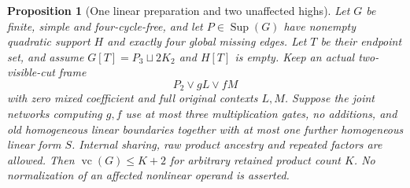 \documentclass[11pt]{article}
\newcommand{\Sup}{\operatorname{Sup}}
\newcommand{\vc}{\operatorname{vc}}
\newtheorem{proposition}[theorem]{Proposition}
\theoremstyle{definition}
\theoremstyle{remark}
\begin{document}
\begin{proposition}[One linear preparation and two unaffected highs]\label{prop:pathpurelinear}
Let $G$ be finite, simple and four-cycle-free, and let $P\in\Sup(G)$ have nonempty quadratic support $H$ and exactly four global missing edges. Let $T$ be their endpoint set, and assume $G[T]=P_3\sqcup2K_2$ and $H[T]$ is empty. Keep an actual two-visible-cut frame
\[
 P_2\vee gL\vee fM
\]
with zero mixed coefficient and full original contexts $L,M$. Suppose the joint networks computing $g,f$ use at most three multiplication gates, no additions, and old homogeneous linear boundaries together with at most one further homogeneous linear form $S$. Internal sharing, raw product ancestry and repeated factors are allowed. Then $\vc(G)\le K+2$ for arbitrary retained product count $K$. No normalization of an affected nonlinear operand is asserted.
\end{proposition}
\end{document}
